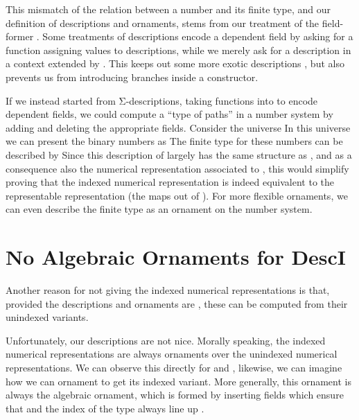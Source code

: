 This mismatch of the relation between a number and its finite type, and our definition of descriptions and ornaments, stems from our treatment of the field-former . Some treatments of descriptions \cite{effectfully,progorn,algorn} encode a dependent field  by asking for a function  assigning values  to descriptions, while we merely ask for a description in a context extended by . This keeps out some more exotic descriptions \cite{?}, but also prevents us from introducing branches inside a constructor.


If we instead started from Σ-descriptions, taking functions into  to encode dependent fields, we could compute a ``type of paths'' in a number system by adding and deleting the appropriate fields. Consider the universe
In this universe we can present the binary numbers as
The finite type for these numbers can be described by
Since this description of  largely has the same structure as , and as a consequence also the numerical representation associated to , this would simplify proving that the indexed numerical representation is indeed equivalent to the representable representation (the maps out of ). For more flexible ornaments, we can even describe the finite type as an ornament on the number system.


\section{No Algebraic Ornaments for DescI}
Another reason for not giving the indexed numerical representations is that, provided the descriptions and ornaments are , these can be computed from their unindexed variants.

Unfortunately, our descriptions are not nice. Morally speaking, the indexed numerical representations are always ornaments over the unindexed numerical representations. We can observe this directly for  and , likewise, we can imagine how we can ornament  to get its indexed variant. More generally, this ornament is always the algebraic ornament, which is formed by inserting fields which ensure that  and the index of the type always line up \cite{algorn}.

